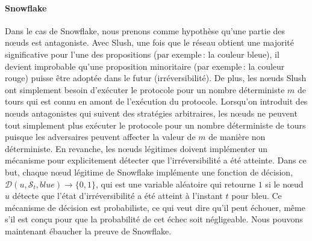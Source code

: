 \documentclass[a4,twocolumn,10pt]{article}
\theoremstyle{definition}
\begin{document}
\paragraph{Snowflake}

Dans le cas de Snowflake, nous prenons comme hypothèse qu'une partie des nœuds est antagoniste. Avec Slush, une
fois que le réseau obtient une majorité significative pour l'une des propositions (par exemple\,: la couleur bleue), il devient
improbable qu'une proposition minoritaire (par exemple\,: la couleur rouge) puisse être adoptée dans le futur (irréversibilité).
De plus, les nœuds Slush ont simplement besoin d'exécuter le protocole pour un nombre déterministe $m$ de tours qui
est connu en amont de l'exécution du protocole. Lorsqu'on introduit des nœuds antagonistes qui suivent des stratégies
arbitraires, les nœuds ne peuvent tout simplement plus exécuter le protocole pour un nombre déterministe de tours puisque
les adversaires peuvent affecter la valeur de $m$ de manière non déterministe. En revanche, les nœuds légitimes doivent
implémenter un mécanisme pour explicitement détecter que l'irréversibilité a été atteinte. Dans ce but, 
chaque nœud légitime de Snowflake implémente une fonction de décision, $\mathcal{D}(u, \mathcal{S}_t, blue) \rightarrow \{0, 1\}$,
qui est une variable aléatoire qui retourne $1$ si le nœud $u$ détecte que l'état d'irréversibilité a été atteint à
l'instant $t$ pour bleu. Ce mécanisme de décision est probabiliste, ce qui veut dire qu'il peut échouer, même s'il est
conçu pour que la probabilité de cet échec soit négligeable. Nous pouvons maintenant ébaucher la preuve de Snowflake.
\end{document}
